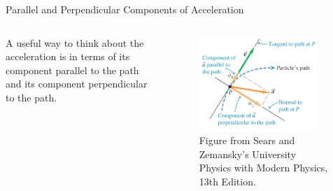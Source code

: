 \documentclass[]{beamer}
\begin{document}
\begin{frame}

    Parallel and Perpendicular Components of Acceleration
    
    \vspace{3mm}


    \begin{columns}[c]
        \column{2in}  %
       

        A useful way to think about the acceleration
        is in terms of its component parallel to the  path and its component perpendicular 
        to the  path.



        \column{2.5in}
        
        \begin{figure}[h!]  
       \includegraphics[width=0.9\textwidth]{images/11.jpg}
        \caption{ {\tiny Figure from Sears and Zemansky's University Physics 
        with Modern Physics, 13th Edition.} }
     \end{figure}
     
     
     
        \end{columns}



\end{frame}




\end{document}
